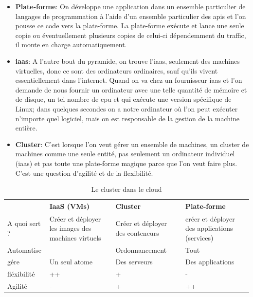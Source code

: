 \begin{onehalfspace}
\begin{itemize}
	\item \textbf{Plate-forme}: On développe une application dans un ensemble particulier de langages de programmation à l'aide d'un ensemble particulier des \acrshort{api}s et l'on pousse ce code vers la plate-forme. La plate-forme exécute et lance une seule copie ou éventuellement plusieurs copies de celui-ci dépendemment du traffic, il monte en charge automatiquement. 
	\item \textbf{\acrshort{iaas}}: A l'autre bout du pyramide, on trouve l'\acrshort{iaas}, seulement des machines virtuelles, donc ce sont des ordinateurs ordinaires, sauf qu'ils vivent essentiellement dans l'internet. Quand on va chez un fournisseur \acrshort{iaas} et l'on demande de nous fournir un ordinateur avec une telle quantité de mémoire et de disque, un tel nombre de \acrshort{cpu} et qui exécute une version spécifique de Linux; dans quelques secondes on a notre ordinateur où l'on peut exécuter n'importe quel logiciel, mais on est responsable de la gestion de la machine entière.
	\item \textbf{Cluster}: C'est lorsque l'on veut gérer un ensemble de machines, un cluster de machines comme une seule entité, pas seulement un ordinateur individuel (\acrshort{iaas}) et pas toute une plate-forme magique parce que l'on veut faire plus. C'est une question d'agilité et de la flexibilité.

\end{itemize}


\def\arraystretch{1.6}%

{
\begin{center}
\begin{table}[H]

	\caption{Le cluster dans le cloud \label{tab:table_label}}
	\begin{tabu}{| X[c] | X[c] | X[c] | X[c] |} 


	\hline
	\textbf{} & \textbf{IaaS (VMs)} & \textbf{Cluster} & \textbf{Plate-forme}\\ [0.95ex] 
	\hline\hline
	A quoi sert ? 	& Créer et déployer les images des machines virtuels & Créer et déployer des conteneurs & créer et déployer des applications (services) \\ 
	Automatise					& - & Ordonnancement & Tout \\ 
	gére					& Un seul atome & Des serveurs & Des applications \\ 
	fléxibilité					& ++ 	& + 	& - \\ 
	Agilité						& - 	& + 	& ++ \\ 
	\hline
	\end{tabu}
\end{table}
\end{center}
}



\end{onehalfspace}
